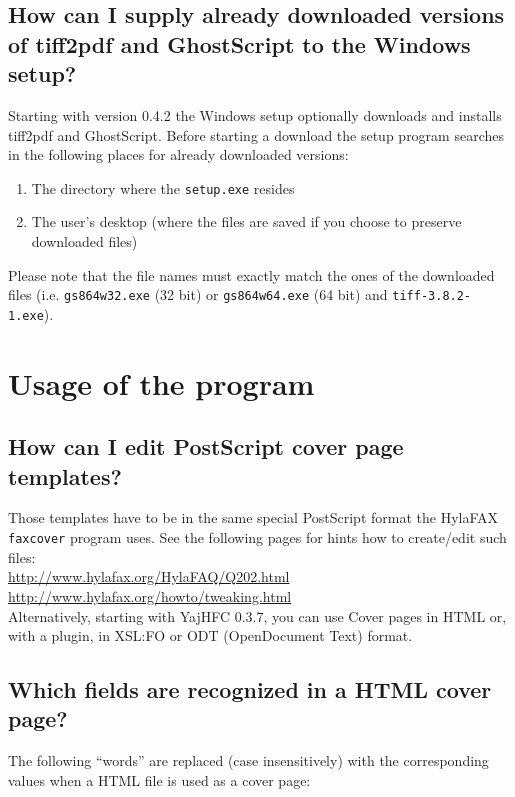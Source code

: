 \documentclass[a4paper,10pt]{scrartcl}
\begin{document}
\subsection{How can I supply already downloaded versions of tiff2pdf and GhostScript to the Windows setup?}

Starting with version 0.4.2 the Windows setup optionally downloads and installs tiff2pdf and GhostScript.
Before starting a download the setup program searches in the following places for already downloaded versions:
\begin{enumerate}
 \item The directory where the \texttt{setup.exe} resides
 \item The user's desktop (where the files are saved if you choose to preserve downloaded files)
\end{enumerate}

Please note that the file names must exactly match the ones of the downloaded files (i.e. \texttt{gs864w32.exe} (32 bit) or \texttt{gs864w64.exe} (64 bit) and \texttt{tiff-3.8.2-1.exe}).

\section{Usage of the program}	

\subsection{How can I edit PostScript cover page templates?}
Those templates have to be in the same special PostScript format the HylaFAX
\texttt{faxcover} program uses. See the following pages for hints how to create/edit
such files: \\
\url{http://www.hylafax.org/HylaFAQ/Q202.html}\\
\url{http://www.hylafax.org/howto/tweaking.html}\\

Alternatively, starting with YajHFC 0.3.7, you can use Cover pages in HTML or, with a plugin, in XSL:FO or ODT (OpenDocument Text) format.

\subsection{Which fields are recognized in a HTML cover page?}

The following ``words'' are replaced (case insensitively) with the corresponding values when a HTML file is used as a cover page:
\end{document}
